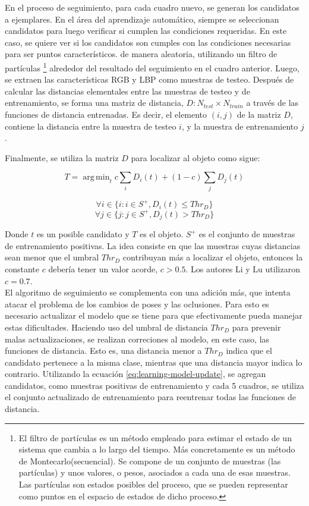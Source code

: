 \documentclass[a4paper,10pt]{article}
\DeclareMathOperator*{\argmin}{arg\,min}
\begin{document}
En el proceso de seguimiento, para cada cuadro nuevo, se generan los
candidatos a ejemplares. En el área del aprendizaje automático, siempre se seleccionan candidatos
para luego verificar si cumplen las condiciones requeridas. En este caso, se quiere ver si los candidatos son
cumples con las condiciones necesarias para ser puntos característicos.
 de manera aleatoria, utilizando un filtro de partículas
\footnote{El filtro de partículas es un método empleado para estimar el estado de un sistema que cambia a lo largo del tiempo. Más
concretamente es un método de Montecarlo(secuencial). Se compone de un conjunto de muestras (las partículas) y unos valores, o pesos,
asociados a cada una de esas muestras. Las partículas son estados posibles del proceso, que se pueden representar como puntos en el espacio
de estados de dicho proceso.}
alrededor del resultado del
seguimiento en el cuadro anterior. Luego, se extraen las características
RGB y LBP como muestras de testeo. Después de calcular las distancias
elementales entre las muestras de testeo y de entrenamiento, se
forma una matriz de distancia, $D: N_{test} \times N_{train}$ a través
de las funciones de distancia entrenadas. Es decir, el elemento $(i,j)$ de la matriz $D$, contiene la distancia
entre la muestra de testeo $i$, y la muestra de entrenamiento $j$.

Finalmente, se utiliza la matriz $D$ para localizar al objeto como sigue:

\begin{equation}
    T = \argmin_{t} c \sum_{i} D_{i}(t) + (1 - c) \sum_{j} D_{j}(t)
\end{equation}

\begin{equation}
    \forall i \in \{i : i \in S^{+}, D_{i}(t) \leq Thr_{D} \}
\end{equation}
\begin{equation}
    \forall j \in \{j : j \in S^{+}, D_{j}(t) > Thr_{D} \}
\end{equation}

Donde $t$ es un posible candidato y $T$ es el objeto. $S^{+}$ es el
conjunto de muestras de entrenamiento positivas. La idea consiste en
que las muestras cuyas distancias sean menor que el umbral $Thr_{D}$
contribuyan más a localizar el objeto, entonces la constante $c$
debería tener un valor acorde, $c > 0.5$. Los autores Li y Lu utilizaron $c = 0.7$.\cite{local-learning}\\

El algoritmo de seguimiento se complementa con una adición más, que
intenta atacar el problema de los cambios de poses y las oclusiones.
Para esto es necesario actualizar el modelo que se tiene para
que efectivamente pueda manejar estas dificultades.
Haciendo uso del umbral de distancia $Thr_{D}$ para prevenir
malas actualizaciones, se realizan correciones al modelo,
en este caso, las funciones de distancia. Esto es, una distancia
menor a $Thr_{D}$ indica que el candidato pertenece a la misma clase,
mientras que una distancia mayor indica lo contrario. Utilizando
la ecuación \ref{eq:learning-model-update}, se agregan candidatos,
como muestras positivas de entrenamiento y cada 5 cuadros,
se utiliza el conjunto actualizado de entrenamiento para
reentrenar todas las funciones de distancia.
\end{document}
